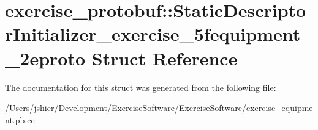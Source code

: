 \hypertarget{structexercise__protobuf_1_1_static_descriptor_initializer__exercise__5fequipment__2eproto}{}\section{exercise\+\_\+protobuf\+:\+:Static\+Descriptor\+Initializer\+\_\+exercise\+\_\+5fequipment\+\_\+2eproto Struct Reference}
\label{structexercise__protobuf_1_1_static_descriptor_initializer__exercise__5fequipment__2eproto}


The documentation for this struct was generated from the following file\+:\begin{DoxyCompactItemize}
\item 
/\+Users/jshier/\+Development/\+Exercise\+Software/\+Exercise\+Software/exercise\+\_\+equipment.\+pb.\+cc\end{DoxyCompactItemize}
